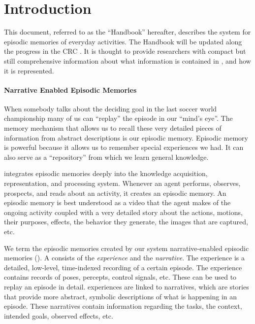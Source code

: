 \section{Introduction}

This document, referred to as the ``\neem Handbook'' hereafter,
describes the \ease system for episodic memories of everyday activities.
The \neem Handbook will be updated along the progress in the CRC \ease.
It is thought to provide \ease researchers with compact but still comprehensive
information about what information is contained in \neems, and how it is represented.

\paragraph{Narrative Enabled Episodic Memories}
When somebody talks about the deciding goal in the
last soccer world championship many of us can ``replay'' the episode in our ``mind's eye''.
The memory mechanism that allows us to recall these very detailed pieces of
information from abstract descriptions is our episodic memory.
Episodic memory is powerful because it allows us to remember special
experiences we had. It can also serve as a ``repository'' from which we learn general knowledge.

\ease integrates episodic memories deeply into the knowledge acquisition, representation, and processing
system. Whenever an agent performs, observes, prospects, and
reads about an activity, it creates an episodic memory. An episodic
memory is best understood as a video that the agent makes of the
ongoing activity coupled with a very detailed story about the actions, motions, their purposes, effects,
the behavior they generate, the images that are captured, etc.

We term the episodic memories created by our system narrative-enabled episodic memories (\neems).
A \neem consists of the \emph{\neem experience} and the \emph{\neem narrative}.
The \neem experience is a detailed, low-level, time-indexed recording
of a certain episode. The experience contains records of poses, percepts, control signals, etc.
These can be used to replay an episode in detail.
\neem experiences are linked to \neem narratives, which are stories
that provide more abstract, symbolic descriptions of what is happening in an episode.
These narratives contain information regarding the tasks, the context, intended goals, observed effects, etc.

